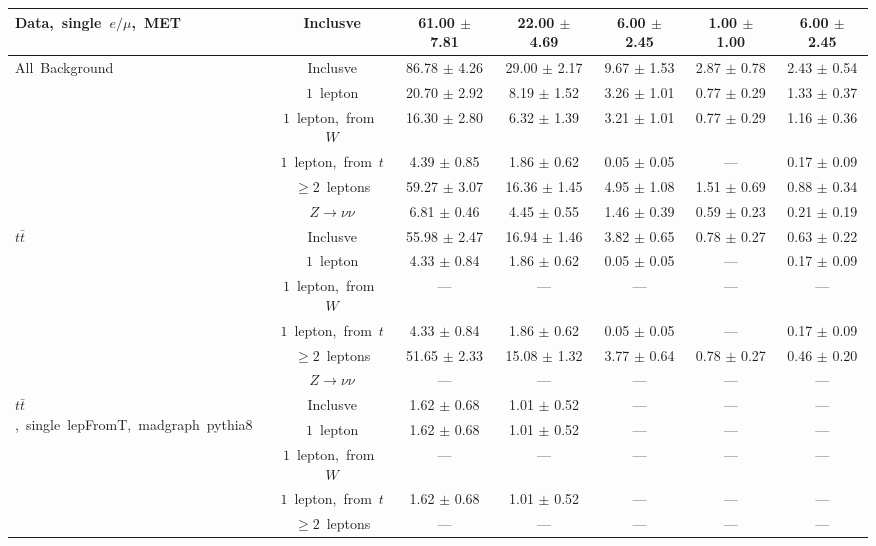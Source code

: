 \documentclass{article}
\begin{document}
\begin{longtable}{|l|c|c|c|c|c|c|}
\multirow{1}{*}{Data,~single~$e/\mu$,~MET} & Inclusve  & 61.00 $\pm$ 7.81  & 22.00 $\pm$ 4.69  & 6.00 $\pm$ 2.45  & 1.00 $\pm$ 1.00  & 6.00 $\pm$ 2.45 \\* 
\hline \hline 
\multirow{6}{*}{All~Background} & Inclusve  & 86.78 $\pm$ 4.26  & 29.00 $\pm$ 2.17  & 9.67 $\pm$ 1.53  & 2.87 $\pm$ 0.78  & 2.43 $\pm$ 0.54 \\* 
 & $1$~lepton  & 20.70 $\pm$ 2.92  & 8.19 $\pm$ 1.52  & 3.26 $\pm$ 1.01  & 0.77 $\pm$ 0.29  & 1.33 $\pm$ 0.37 \\* 
 & $1$~lepton,~from~$W$  & 16.30 $\pm$ 2.80  & 6.32 $\pm$ 1.39  & 3.21 $\pm$ 1.01  & 0.77 $\pm$ 0.29  & 1.16 $\pm$ 0.36 \\* 
 & $1$~lepton,~from~$t$  & 4.39 $\pm$ 0.85  & 1.86 $\pm$ 0.62  & 0.05 $\pm$ 0.05  & ---  & 0.17 $\pm$ 0.09 \\* 
 & $\ge2$~leptons  & 59.27 $\pm$ 3.07  & 16.36 $\pm$ 1.45  & 4.95 $\pm$ 1.08  & 1.51 $\pm$ 0.69  & 0.88 $\pm$ 0.34 \\* 
 & $Z\rightarrow\nu\nu$  & 6.81 $\pm$ 0.46  & 4.45 $\pm$ 0.55  & 1.46 $\pm$ 0.39  & 0.59 $\pm$ 0.23  & 0.21 $\pm$ 0.19 \\* 
\hline 
\multirow{6}{*}{$t\bar{t}$} & Inclusve  & 55.98 $\pm$ 2.47  & 16.94 $\pm$ 1.46  & 3.82 $\pm$ 0.65  & 0.78 $\pm$ 0.27  & 0.63 $\pm$ 0.22 \\* 
 & $1$~lepton  & 4.33 $\pm$ 0.84  & 1.86 $\pm$ 0.62  & 0.05 $\pm$ 0.05  & ---  & 0.17 $\pm$ 0.09 \\* 
 & $1$~lepton,~from~$W$  & ---  & ---  & ---  & ---  & --- \\* 
 & $1$~lepton,~from~$t$  & 4.33 $\pm$ 0.84  & 1.86 $\pm$ 0.62  & 0.05 $\pm$ 0.05  & ---  & 0.17 $\pm$ 0.09 \\* 
 & $\ge2$~leptons  & 51.65 $\pm$ 2.33  & 15.08 $\pm$ 1.32  & 3.77 $\pm$ 0.64  & 0.78 $\pm$ 0.27  & 0.46 $\pm$ 0.20 \\* 
 & $Z\rightarrow\nu\nu$  & ---  & ---  & ---  & ---  & --- \\* 
\hline 
\multirow{6}{*}{$t\bar{t}$,~single~lepFromT,~madgraph~pythia8} & Inclusve  & 1.62 $\pm$ 0.68  & 1.01 $\pm$ 0.52  & ---  & ---  & --- \\* 
 & $1$~lepton  & 1.62 $\pm$ 0.68  & 1.01 $\pm$ 0.52  & ---  & ---  & --- \\* 
 & $1$~lepton,~from~$W$  & ---  & ---  & ---  & ---  & --- \\* 
 & $1$~lepton,~from~$t$  & 1.62 $\pm$ 0.68  & 1.01 $\pm$ 0.52  & ---  & ---  & --- \\* 
 & $\ge2$~leptons  & ---  & ---  & ---  & ---  & --- \\* 

\end{longtable}
\end{document}
